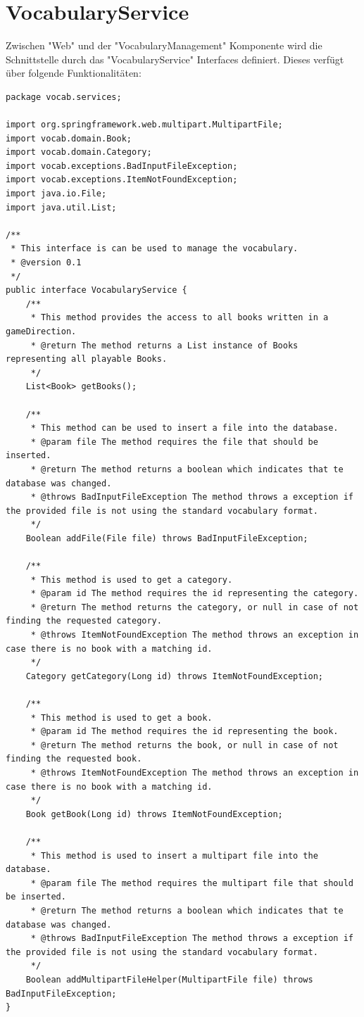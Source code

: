 \section*{VocabularyService}
Zwischen "Web" und der "VocabularyManagement" Komponente wird die Schnittstelle durch das "VocabularyService" Interfaces definiert. Dieses verfügt über folgende Funktionalitäten:
\begin{lstlisting}
package vocab.services;

import org.springframework.web.multipart.MultipartFile;
import vocab.domain.Book;
import vocab.domain.Category;
import vocab.exceptions.BadInputFileException;
import vocab.exceptions.ItemNotFoundException;
import java.io.File;
import java.util.List;

/**
 * This interface is can be used to manage the vocabulary.
 * @version 0.1
 */
public interface VocabularyService {
    /**
     * This method provides the access to all books written in a gameDirection.
     * @return The method returns a List instance of Books representing all playable Books.
     */
    List<Book> getBooks();

    /**
     * This method can be used to insert a file into the database.
     * @param file The method requires the file that should be inserted.
     * @return The method returns a boolean which indicates that te database was changed.
     * @throws BadInputFileException The method throws a exception if the provided file is not using the standard vocabulary format.
     */
    Boolean addFile(File file) throws BadInputFileException;

    /**
     * This method is used to get a category.
     * @param id The method requires the id representing the category.
     * @return The method returns the category, or null in case of not finding the requested category.
     * @throws ItemNotFoundException The method throws an exception in case there is no book with a matching id.
     */
    Category getCategory(Long id) throws ItemNotFoundException;

    /**
     * This method is used to get a book.
     * @param id The method requires the id representing the book.
     * @return The method returns the book, or null in case of not finding the requested book.
     * @throws ItemNotFoundException The method throws an exception in case there is no book with a matching id.
     */
    Book getBook(Long id) throws ItemNotFoundException;

    /**
     * This method is used to insert a multipart file into the database.
     * @param file The method requires the multipart file that should be inserted.
     * @return The method returns a boolean which indicates that te database was changed.
     * @throws BadInputFileException The method throws a exception if the provided file is not using the standard vocabulary format.
     */
    Boolean addMultipartFileHelper(MultipartFile file) throws BadInputFileException;
}    
\end{lstlisting}
\clearpage
